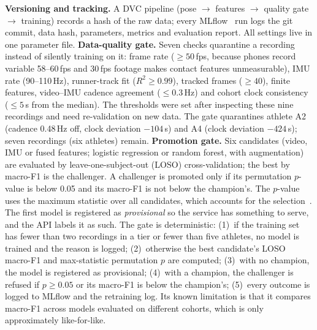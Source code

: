 \documentclass[conference]{IEEEtran}
\begin{document}
\textbf{Versioning and tracking.} A DVC pipeline (pose $\rightarrow$ features $\rightarrow$ quality gate $\rightarrow$ training) records a hash of the raw data; every MLflow~\cite{zaharia2018} run logs the git commit, data hash, parameters, metrics and evaluation report. All settings live in one parameter file.
\textbf{Data-quality gate.} Seven checks quarantine a recording instead of silently training on it: frame rate ($\geq50$\,fps, because phones record variable 58--60\,fps and 30\,fps footage makes contact features unmeasurable), IMU rate (90--110\,Hz), runner-track fit ($R^2\geq0.99$), tracked frames ($\geq40$), finite features, video--IMU cadence agreement ($\leq0.3$\,Hz) and cohort clock consistency ($\leq5$\,s from the median). The thresholds were set after inspecting these nine recordings and need re-validation on new data. The gate quarantines athlete A2 (cadence 0.48\,Hz off, clock deviation $-104$\,s) and A4 (clock deviation $-424$\,s); seven recordings (six athletes) remain.
\textbf{Promotion gate.} Six candidates (video, IMU or fused features; logistic regression or random forest, with augmentation) are evaluated by leave-one-subject-out (LOSO) cross-validation; the best by macro-F1 is the challenger. A challenger is promoted only if its permutation $p$-value is below 0.05 and its macro-F1 is not below the champion's. The $p$-value uses the maximum statistic over all candidates, which accounts for the selection~\cite{phipson2010}. The first model is registered as \emph{provisional} so the service has something to serve, and the API labels it as such.
The gate is deterministic: (1)~if the training set has fewer than two recordings in a tier or fewer than five athletes, no model is trained and the reason is logged; (2)~otherwise the best candidate's LOSO macro-F1 and max-statistic permutation $p$ are computed; (3)~with no champion, the model is registered as provisional; (4)~with a champion, the challenger is refused if $p\geq0.05$ or its macro-F1 is below the champion's; (5)~every outcome is logged to MLflow and the retraining log. Its known limitation is that it compares macro-F1 across models evaluated on different cohorts, which is only approximately like-for-like.
\end{document}
